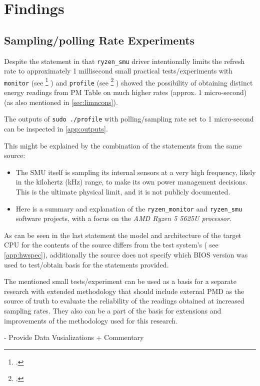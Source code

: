 \section{Findings}

\subsection{Sampling/polling Rate Experiments}

Despite the statement in \textcite{ryzen_managment_linux} that
\texttt{ryzen\_smu} driver intentionally limits the refresh rate to
approximately 1 millisecond small practical tests/experiments with
\texttt{monitor} (see \footcite{yahdzhyiev2025repo} )
and \texttt{profile} (see \footcite{yahdzhyiev2025repo} )
showed the possibility of obtaining distinct energy readings from
\gls{PM} Table on much higher rates (approx. 1 micro-second)
(as also mentioned in \cref{sec:limncons}).

The outputs of \texttt{sudo ./profile} with polling/sampling rate set to
1 micro-second can be inspected in \cref{app:outputs}.

This might be explained by the combination of the statements from the same
source:

\begin{itemize}
  \item The \gls{SMU} itself is sampling its internal sensors at a very high
    frequency, likely in the kilohertz (kHz) range, to make its own power
    management decisions.
    This is the ultimate physical limit, and it is not publicly documented.
  \item Here is a summary and explanation of the \texttt{ryzen\_monitor} and
    \texttt{ryzen\_smu} software projects, with a focus on the
    \emph{AMD Ryzen 5 5625U processor}.
\end{itemize}
 \parencite{ryzen_managment_linux}

As can be seen in the last statement the model and architecture of the target
\gls{CPU} for the contents of the source differs from the test system's (
see \cref{app:hwspec}), additionally the source does not specify which \gls{BIOS}
version was used to test/obtain basis for the statements provided.

The mentioned small tests/experiment can be used as a basis for a separate
research with extended methodology that should include external \gls{PMD}
as the source of truth to evaluate the reliability of the readings
obtained at increased sampling rates. They also can be a part of the
basis for extensions and improvements of the methodology used for this
research.

- Provide Data Vusializations + Commentary
